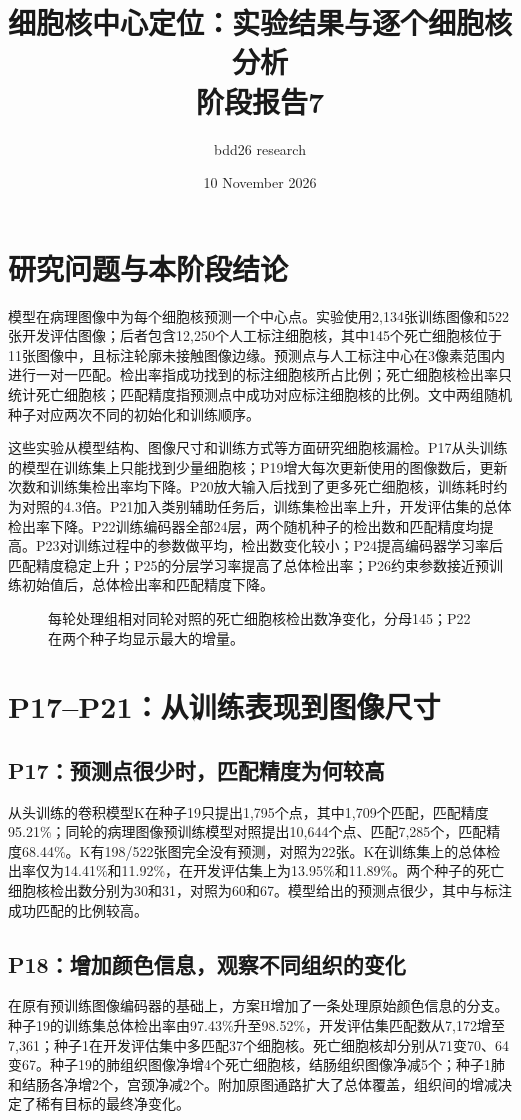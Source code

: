 \documentclass[UTF8,zihao=-4,fontset=windows]{ctexart}
\title{\bfseries 细胞核中心定位：实验结果与逐个细胞核分析\\\large 阶段报告7}\author{bdd26 research}\date{10 November 2026}
\begin{document}
\maketitle\tableofcontents\newpage
\section{研究问题与本阶段结论}
模型在病理图像中为每个细胞核预测一个中心点。实验使用2,134张训练图像和522张开发评估图像；后者包含12,250个人工标注细胞核，其中145个死亡细胞核位于11张图像中，且标注轮廓未接触图像边缘。预测点与人工标注中心在3像素范围内进行一对一匹配。检出率指成功找到的标注细胞核所占比例；死亡细胞核检出率只统计死亡细胞核；匹配精度指预测点中成功对应标注细胞核的比例。文中两组随机种子对应两次不同的初始化和训练顺序。

这些实验从模型结构、图像尺寸和训练方式等方面研究细胞核漏检。P17从头训练的模型在训练集上只能找到少量细胞核；P19增大每次更新使用的图像数后，更新次数和训练集检出率均下降。P20放大输入后找到了更多死亡细胞核，训练耗时约为对照的4.3倍。P21加入类别辅助任务后，训练集检出率上升，开发评估集的总体检出率下降。P22训练编码器全部24层，两个随机种子的检出数和匹配精度均提高。P23对训练过程中的参数做平均，检出数变化较小；P24提高编码器学习率后匹配精度稳定上升；P25的分层学习率提高了总体检出率；P26约束参数接近预训练初始值后，总体检出率和匹配精度下降。
\begin{figure}[H]\centering\caption{每轮处理组相对同轮对照的死亡细胞核检出数净变化，分母145；P22在两个种子均显示最大的增量。}\end{figure}
\section{P17--P21：从训练表现到图像尺寸}
\subsection{P17：预测点很少时，匹配精度为何较高}
从头训练的卷积模型K在种子19只提出1,795个点，其中1,709个匹配，匹配精度95.21\%；同轮的病理图像预训练模型对照提出10,644个点、匹配7,285个，匹配精度68.44\%。K有198/522张图完全没有预测，对照为22张。K在训练集上的总体检出率仅为14.41\%和11.92\%，在开发评估集上为13.95\%和11.89\%。两个种子的死亡细胞核检出数分别为30和31，对照为60和67。模型给出的预测点很少，其中与标注成功匹配的比例较高。

\subsection{P18：增加颜色信息，观察不同组织的变化}
在原有预训练图像编码器的基础上，方案H增加了一条处理原始颜色信息的分支。种子19的训练集总体检出率由97.43\%升至98.52\%，开发评估集匹配数从7,172增至7,361；种子1在开发评估集中多匹配37个细胞核。死亡细胞核却分别从71变70、64变67。种子19的肺组织图像净增4个死亡细胞核，结肠组织图像净减5个；种子1肺和结肠各净增2个，宫颈净减2个。附加原图通路扩大了总体覆盖，组织间的增减决定了稀有目标的最终净变化。
\end{document}
